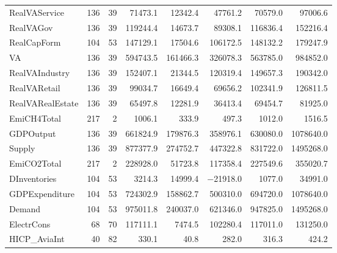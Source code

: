 {\begin{tabular}[t]{lrrrrrrr}
RealVAService & 136 & 39 & \num{71473.1} & \num{12342.4} & \num{47761.2} & \num{70579.0} & \num{97006.6}\\
RealVAGov & 136 & 39 & \num{119244.4} & \num{14673.7} & \num{89308.1} & \num{116836.4} & \num{152216.4}\\
RealCapForm & 104 & 53 & \num{147129.1} & \num{17504.6} & \num{106172.5} & \num{148132.2} & \num{179247.9}\\
VA & 136 & 39 & \num{594743.5} & \num{161466.3} & \num{326078.3} & \num{563785.0} & \num{984852.0}\\
RealVAIndustry & 136 & 39 & \num{152407.1} & \num{21344.5} & \num{120319.4} & \num{149657.3} & \num{190342.0}\\
RealVARetail & 136 & 39 & \num{99034.7} & \num{16649.4} & \num{69656.2} & \num{102341.9} & \num{126811.5}\\
RealVARealEstate & 136 & 39 & \num{65497.8} & \num{12281.9} & \num{36413.4} & \num{69454.7} & \num{81925.0}\\
EmiCH4Total & 217 & 2 & \num{1006.1} & \num{333.9} & \num{497.3} & \num{1012.0} & \num{1516.5}\\
GDPOutput & 136 & 39 & \num{661824.9} & \num{179876.3} & \num{358976.1} & \num{630080.0} & \num{1078640.0}\\
Supply & 136 & 39 & \num{877377.9} & \num{274752.7} & \num{447322.8} & \num{831722.0} & \num{1495268.0}\\
EmiCO2Total & 217 & 2 & \num{228928.0} & \num{51723.8} & \num{117358.4} & \num{227549.6} & \num{355020.7}\\
DInventories & 104 & 53 & \num{3214.3} & \num{14999.4} & \num{-21918.0} & \num{1077.0} & \num{34991.0}\\
GDPExpenditure & 104 & 53 & \num{724302.9} & \num{158862.7} & \num{500310.0} & \num{694720.0} & \num{1078640.0}\\
Demand & 104 & 53 & \num{975011.8} & \num{240037.0} & \num{621346.0} & \num{947825.0} & \num{1495268.0}\\
ElectrCons & 68 & 70 & \num{117111.1} & \num{7474.5} & \num{102280.4} & \num{117011.0} & \num{131250.0}\\
HICP\_AviaInt & 40 & 82 & \num{330.1} & \num{40.8} & \num{282.0} & \num{316.3} & \num{424.2}\\
\bottomrule
\end{tabular}}

